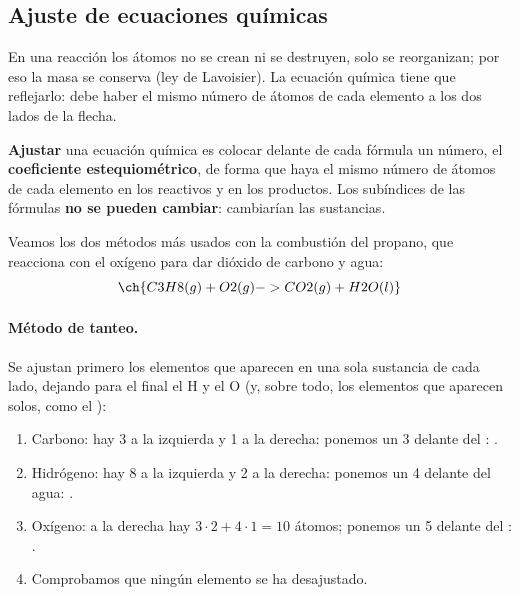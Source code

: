 \subsection{Ajuste de ecuaciones químicas}

En una reacción los átomos no se crean ni se destruyen, solo se reorganizan; por eso la masa se conserva (ley de Lavoisier). La
ecuación química tiene que reflejarlo: debe haber el mismo número de átomos de cada elemento a los dos lados de la flecha.

\begin{definition}
    \textbf{Ajustar} una ecuación química es colocar delante de cada fórmula un número, el \textbf{coeficiente estequiométrico},
    de forma que haya el mismo número de átomos de cada elemento en los reactivos y en los productos. Los subíndices de las
    fórmulas \textbf{no se pueden cambiar}: cambiarían las sustancias.
\end{definition}

Veamos los dos métodos más usados con la combustión del propano, que reacciona con el oxígeno para dar dióxido de carbono y agua:
\[ \ch{C3H8(g) + O2(g) -> CO2(g) + H2O(l)} \]

\paragraph{Método de tanteo.} Se ajustan primero los elementos que aparecen en una sola sustancia de cada lado, dejando para el
final el H y el O (y, sobre todo, los elementos que aparecen solos, como el ):
\begin{enumerate}
    \item Carbono: hay 3 a la izquierda y 1 a la derecha: ponemos un 3 delante del : .
    \item Hidrógeno: hay 8 a la izquierda y 2 a la derecha: ponemos un 4 delante del agua: .
    \item Oxígeno: a la derecha hay \(3 \cdot 2 + 4 \cdot 1 = 10\) átomos; ponemos un 5 delante del :
    .
    \item Comprobamos que ningún elemento se ha desajustado.
\end{enumerate}

